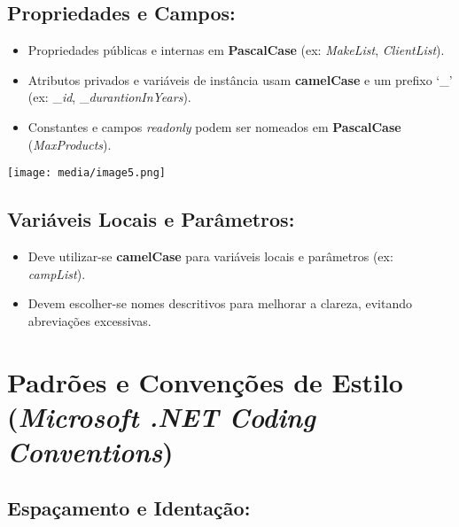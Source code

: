 \documentclass[
]{article}
\begin{document}
\hypertarget{propriedades-e-campos}{%
\subsection{Propriedades e Campos:}\label{propriedades-e-campos}}

\begin{itemize}
\item
  Propriedades públicas e internas em \textbf{PascalCase} (ex:
  \emph{MakeList}, \emph{ClientList}).
\item
  Atributos privados e variáveis de instância usam \textbf{camelCase} e
  um prefixo `\_' (ex: \_\emph{id}, \_\emph{durantionInYears}).
\item
  Constantes e campos \emph{readonly} podem ser nomeados em
  \textbf{PascalCase} (\emph{MaxProducts}).
\end{itemize}

\texttt{[image: media/image5.png]}

\hypertarget{variuxe1veis-locais-e-paruxe2metros}{%
\subsection{Variáveis Locais e
Parâmetros:}\label{variuxe1veis-locais-e-paruxe2metros}}

\begin{itemize}
\item
  Deve utilizar-se \textbf{camelCase} para variáveis locais e parâmetros
  (ex: \emph{campList}).
\item
  Devem escolher-se nomes descritivos para melhorar a clareza, evitando
  abreviações excessivas.
\end{itemize}

\hypertarget{padruxf5es-e-convenuxe7uxf5es-de-estilo-microsoft-.net-coding-conventions}{%
\section{\texorpdfstring{Padrões e Convenções de Estilo (\emph{Microsoft
.NET Coding
Conventions})}{Padrões e Convenções de Estilo (Microsoft .NET Coding Conventions)}}\label{padruxf5es-e-convenuxe7uxf5es-de-estilo-microsoft-.net-coding-conventions}}

\hypertarget{espauxe7amento-e-identauxe7uxe3o}{%
\subsection{Espaçamento e
Identação:}\label{espauxe7amento-e-identauxe7uxe3o}}
\end{document}
